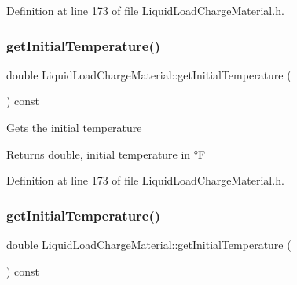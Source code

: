 Definition at line 173 of file Liquid\+Load\+Charge\+Material.\+h.

\mbox{\label{class_liquid_load_charge_material_ab80229a78f884fb07e756665a616d401}} 
\subsubsection{\texorpdfstring{get\+Initial\+Temperature()}{getInitialTemperature()}\hspace{0.1cm}{\footnotesize\ttfamily [2/3]}}
{\footnotesize\ttfamily double Liquid\+Load\+Charge\+Material\+::get\+Initial\+Temperature (\begin{DoxyParamCaption}{ }\end{DoxyParamCaption}) const\hspace{0.3cm}{\ttfamily [inline]}}

Gets the initial temperature \begin{DoxyReturn}{Returns}
double, initial temperature in °F 
\end{DoxyReturn}


Definition at line 173 of file Liquid\+Load\+Charge\+Material.\+h.

\mbox{\label{class_liquid_load_charge_material_ab80229a78f884fb07e756665a616d401}} 
\subsubsection{\texorpdfstring{get\+Initial\+Temperature()}{getInitialTemperature()}\hspace{0.1cm}{\footnotesize\ttfamily [3/3]}}
{\footnotesize\ttfamily double Liquid\+Load\+Charge\+Material\+::get\+Initial\+Temperature (\begin{DoxyParamCaption}{ }\end{DoxyParamCaption}) const\hspace{0.3cm}{\ttfamily [inline]}}

